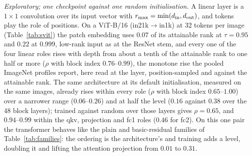 \documentclass[10pt,journal,compsoc]{IEEEtran}
\begin{document}
\emph{Exploratory; one checkpoint against one random initialisation.} A linear
layer is a $1\!\times\!1$ convolution over its input vector with
$r_{\max} = \min(d_{\rm in}, d_{\rm out})$, and tokens play the role of
positions. On a ViT-B/16 \cite{dosovitskiy2021vit} (in21k$\to$in1k) at 32
tokens per image (Table~\ref{tab:svit}) the patch embedding uses $0.07$ of
its attainable rank at $\tau = 0.95$ and $0.22$ at $0.999$, low-rank input
as at the ResNet stem, and every one of the four linear roles rises with
depth from about a tenth of the attainable rank to one half or more
($\rho$ with block index $0.76$--$0.99$), the monotone rise the pooled
ImageNet profiles report, here read at the layer, position-sampled and
against the attainable rank. The same architecture at its default
initialisation, measured on the same images, already rises within every
role ($\rho$ with block index $0.65$--$1.00$) over a narrower range
($0.06$--$0.26$) and at half the level ($0.16$ against $0.38$ over the 48
block layers); trained against random over those layers gives
$\rho = 0.65$, and $0.94$--$0.99$ within the qkv, projection and fc1
roles ($0.46$ for fc2). On this one pair the transformer behaves like the
plain and basic-residual families of Table~\ref{tab:families}: the
ordering is the architecture's and training adds a level, doubling it and
lifting the attention projection from $0.01$ to $0.31$.


\begin{table}[t]
  \centering
  \caption{Decomposition of $k^*/r_{\max}$ by Equation~\eqref{eq:decomp}, medians
  over a checkpoint's $L$ dense convolutions on the $6{,}400$-image subset.
  \emph{out}: measured; \emph{kernel}: $WW^{\top}$ (white patches);
  \emph{data}: $\Sigma_{\rm patch}$ capped at $r_{\max}$; \emph{ortho}:
  orthogonalised kernel with the measured patches. $\rho$ columns are Spearman
  correlations across layers with \emph{out}. The random initialisation is one
  seed.}
  \label{tab:sdecompose}
  \footnotesize
  
\end{table}

\begin{table}[t]
  \centering
  \caption{Image bootstrap of the bearing numbers (Robustness of the Protocol, above): the $6{,}400$-image subset
  cut into 32 blocks of 200 consecutive images, blocks resampled with replacement 200 times, the
  covariances merged by the law of total scatter and every statistic recomputed; point estimate and
  $[2.5, 97.5]$ percentiles. ResNet-50 V1 and VGG-16 (BN), each with one random initialisation (seed 0;
  a different draw from the random controls of the main text). The pooled-estimator rows use the layers
  that pass the pooled gate on $6{,}400$ images (15 and 4), a smaller set than the $50{,}000$-image
  counts of the main text; the block-output count is for this one checkpoint, against 161 over nine
  checkpoints in Section~\ref{sec:blockout}.}
  \label{tab:sbootstrap}
  \footnotesize
  
\end{table}
\end{document}
